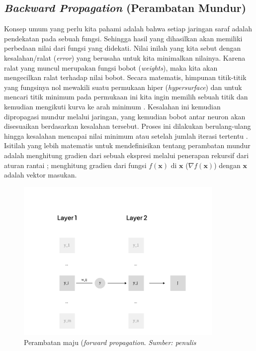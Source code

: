 \subsection{\emph{Backward Propagation} (Perambatan Mundur)}
Konsep umum yang perlu kita pahami adalah bahwa setiap jaringan saraf adalah pendekatan pada sebuah fungsi. Sehingga hasil yang dihasilkan akan memiliki perbedaan nilai dari fungsi yang didekati. Nilai inilah yang kita sebut dengan kesalahan/ralat (\emph{error}) yang berusaha untuk kita minimalkan nilainya. Karena ralat yang muncul merupakan fungsi bobot (\emph{weights}), maka kita akan mengecilkan ralat terhadap nilai bobot. Secara matematis, himpunan titik-titik yang fungsinya nol mewakili suatu permukaan hiper (\emph{hypersurface}) dan untuk mencari titik minimum pada permukaan ini kita ingin memilih sebuah titik dan kemudian mengikuti kurva ke arah minimum \citep{zocca_spacagna_slater_roelants_2017}. Kesalahan ini kemudian dipropagasi mundur melalui jaringan, yang kemudian bobot antar neuron akan disesuaikan berdasarkan kesalahan tersebut. Proses ini dilakukan berulang-ulang hingga kesalahan mencapai nilai minimum atau setelah jumlah iterasi tertentu \citep{szeliski_2011}. Isitilah yang lebih matematis untuk mendefinisikan tentang perambatan mundur adalah menghitung gradien dari sebuah ekspresi melalui penerapan rekursif dari aturan rantai \citep{Li_Li_Gao}; menghitung gradien dari fungsi $f(\textbf{x})$ di $\textbf{x}$ ($\nabla f(\textbf{x})$) dengan $\textbf{x}$ adalah vektor masukan.

\begin{figure}[h]
    \centering
    \includegraphics[width=10cm]{gambar/backprop2.png}
    \caption{Perambatan maju (\emph{forward propagation}. \emph{Sumber: penulis}}
    \label{backprop}
\end{figure}

